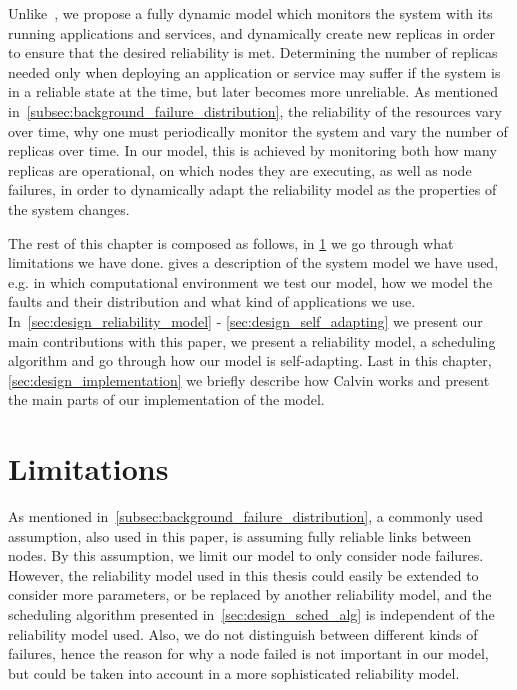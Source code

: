 \documentclass{cslthse-msc}
\begin{document}
Unlike~\cite{designFaultTolerantSched, evalReplicationSched, taskSchedulingReplication, effTaskReplMobGrid, relGridServicePredConstraint}, we propose a fully dynamic model which monitors the system with its running applications and services, and dynamically create new replicas in order to ensure that the desired reliability is met. Determining the number of replicas needed only when deploying an application or service may suffer if the system is in a reliable state at the time, but later becomes more unreliable. As mentioned in~\cref{subsec:background_failure_distribution}, the reliability of the resources vary over time, why one must periodically monitor the system and vary the number of replicas over time. In our model, this is achieved by monitoring both how many replicas are operational, on which nodes they are executing, as well as node failures, in order to dynamically adapt the reliability model as the properties of the system changes.

The rest of this chapter is composed as follows, in \cref{sec:design_limitations} we go through what limitations we have done.  gives a description of the system model we have used, e.g. in which computational environment we test our model, how we model the faults and their distribution and what kind of applications we use. In~\cref{sec:design_reliability_model} - \cref{sec:design_self_adapting} we present our main contributions with this paper, we present a reliability model, a scheduling algorithm and go through how our model is self-adapting. Last in this chapter, \cref{sec:design_implementation} we briefly describe how Calvin works and present the main parts of our implementation of the model.

\section{Limitations} \label{sec:design_limitations}
As mentioned in~\cref{subsec:background_failure_distribution}, a commonly used assumption, also used in this paper, is assuming fully reliable links between nodes. By this assumption, we limit our model to only consider node failures. However, the reliability model used in this thesis could easily be extended to consider more parameters, or be replaced by another reliability model, and the scheduling algorithm presented in~\cref{sec:design_sched_alg} is independent of the reliability model used. Also, we do not distinguish between different kinds of failures, hence the reason for why a node failed is not important in our model, but could be taken into account in a more sophisticated reliability model.
\end{document}
